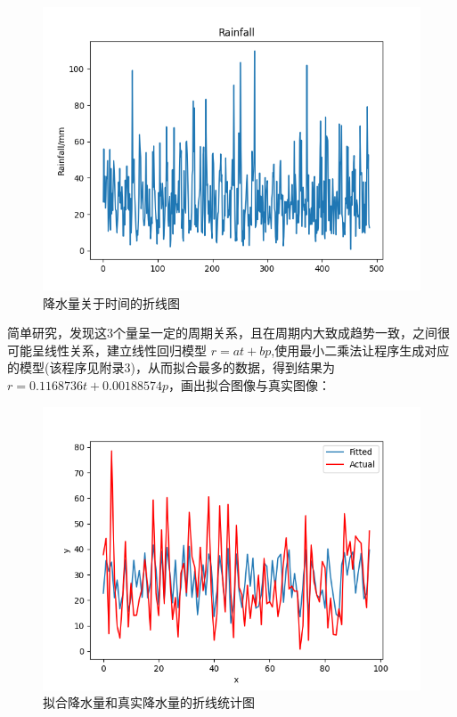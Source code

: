 \documentclass[UTF8, a4paper]{ctexart}
\begin{document}
\clearpage

\begin{figure}[h!]
	\centering
	\includegraphics[scale=0.5]{rr.png}
	\caption{降水量关于时间的折线图}
\end{figure}
\newpage

简单研究，发现这3个量呈一定的周期关系，且在周期内大致成趋势一致，之间很可能呈线性关系，建立线性回归模型 $r=at+bp$,使用最小二乘法让程序生成对应的模型(该程序见附录3)，从而拟合最多的数据，得到结果为$r=0.1168736t+0.00188574p$，画出拟合图像与真实图像：

\begin{figure}[h!]
	\centering
	\includegraphics[scale=0.5]{fit1.png}
	\caption{拟合降水量和真实降水量的折线统计图}
\end{figure}
\end{document}
